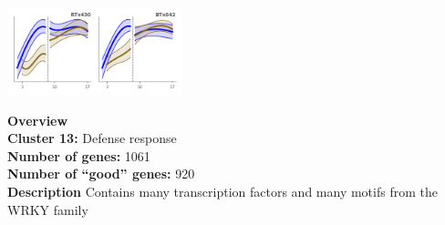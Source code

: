 \begin{multicols}{2}
\includegraphics[width=2in]{figures/clusters/root_Preflowering_12.png}
\columnbreak

\noindent \textbf{Overview}\\\textbf{Cluster 13:} Defense response \\
\textbf{Number of genes:} 1061 \\
\textbf{Number of ``good'' genes:} 920 \\
\textbf{Description} Contains many transcription factors and many motifs from the WRKY family \\
\end{multicols}

